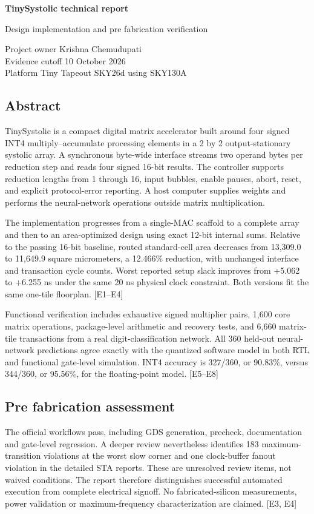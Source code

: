 \documentclass[10pt,letterpaper]{article}
\begin{document}
{\LARGE\bfseries TinySystolic technical report\par}\vspace{8pt}
Design implementation and pre fabrication verification

Project owner Krishna Chemudupati\\Evidence cutoff 10 October 2026\\Platform Tiny Tapeout SKY26d using SKY130A

\subsection*{Abstract}
TinySystolic is a compact digital matrix accelerator built around four signed INT4 multiply--accumulate processing elements in a 2 by 2 output-stationary systolic array. A synchronous byte-wide interface streams two operand bytes per reduction step and reads four signed 16-bit results. The controller supports reduction lengths from 1 through 16, input bubbles, enable pauses, abort, reset, and explicit protocol-error reporting. A host computer supplies weights and performs the neural-network operations outside matrix multiplication.

The implementation progresses from a single-MAC scaffold to a complete array and then to an area-optimized design using exact 12-bit internal sums. Relative to the passing 16-bit baseline, routed standard-cell area decreases from 13,309.0 to 11,649.9 square micrometers, a 12.466\% reduction, with unchanged interface and transaction cycle counts. Worst reported setup slack improves from +5.062 to +6.255 ns under the same 20 ns physical clock constraint. Both versions fit the same one-tile floorplan. [E1--E4]

Functional verification includes exhaustive signed multiplier pairs, 1,600 core matrix operations, package-level arithmetic and recovery tests, and 6,660 matrix-tile transactions from a real digit-classification network. All 360 held-out neural-network predictions agree exactly with the quantized software model in both RTL and functional gate-level simulation. INT4 accuracy is 327/360, or 90.83\%, versus 344/360, or 95.56\%, for the floating-point model. [E5--E8]

\subsection*{Pre fabrication assessment}
The official workflows pass, including GDS generation, precheck, documentation and gate-level regression. A deeper review nevertheless identifies 183 maximum-transition violations at the worst slow corner and one clock-buffer fanout violation in the detailed STA reports. These are unresolved review items, not waived conditions. The report therefore distinguishes successful automated execution from complete electrical signoff. No fabricated-silicon measurements, power validation or maximum-frequency characterization are claimed. [E3, E4]
\end{document}

